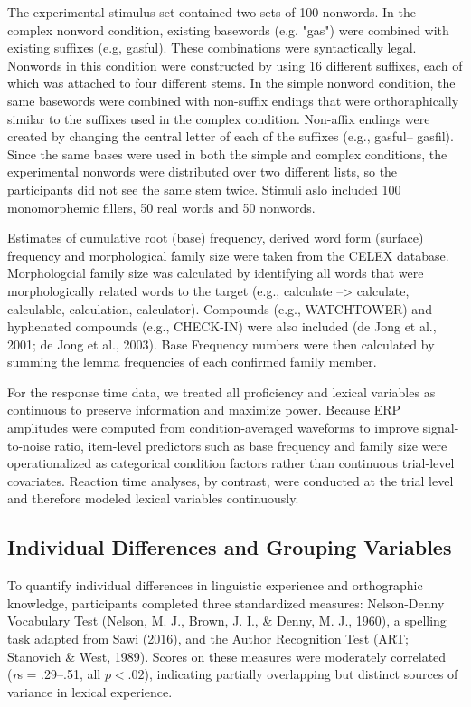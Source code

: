 \documentclass[preprint,12pt, authoryear, review]{elsarticle}
\begin{document}
The experimental stimulus set contained two sets of 100 nonwords. In the complex nonword condition, existing basewords (e.g. "gas") were combined with existing suffixes (e.g, gasful). These combinations were syntactically legal. Nonwords in this condition were constructed by using 16 different suffixes, each of which was attached to four different stems. In the simple nonword condition, the same basewords were combined with non-suffix endings that were orthoraphically similar to the suffixes used in the complex condition. Non-affix endings were created by changing the central letter of each of the suffixes (e.g., gasful-- gasfil). Since the same bases were used in both the simple and complex conditions, the experimental nonwords were distributed over two different lists, so the participants did not see the same stem twice.  Stimuli aslo included 100 monomorphemic fillers, 50 real words and 50 nonwords.

Estimates of cumulative root (base) frequency, derived word form (surface) frequency and morphological family size were taken from the CELEX database. Morphologcial family size was calculated by identifying all words that were morphologically related words to the target (e.g., calculate --> calculate, calculable, calculation, calculator). Compounds (e.g., WATCHTOWER) and hyphenated compounds (e.g., CHECK-IN) were also included (de Jong et al., 2001; de Jong et al., 2003).  Base Frequency numbers were then calculated by summing the lemma frequencies of each confirmed family member. 



For the response time data, we treated all proficiency and lexical variables as continuous to preserve information and maximize power. Because ERP amplitudes were computed from condition-averaged waveforms to improve signal-to-noise ratio, item-level predictors such as base frequency and family size were operationalized as categorical condition factors rather than continuous trial-level covariates. Reaction time analyses, by contrast, were conducted at the trial level and therefore modeled lexical variables continuously.




\subsection{Individual Differences and Grouping Variables}

To quantify individual differences in linguistic experience and orthographic knowledge, participants completed three standardized measures: Nelson-Denny Vocabulary Test (Nelson, M. J., Brown, J. I., \& Denny, M. J., 1960), a spelling task adapted from Sawi (2016), and the Author Recognition Test (ART; Stanovich \& West, 1989). Scores on these measures were moderately correlated (\textit{r}s = .29–.51, all $p < .02$), indicating partially overlapping but distinct sources of variance in lexical experience.
\end{document}
